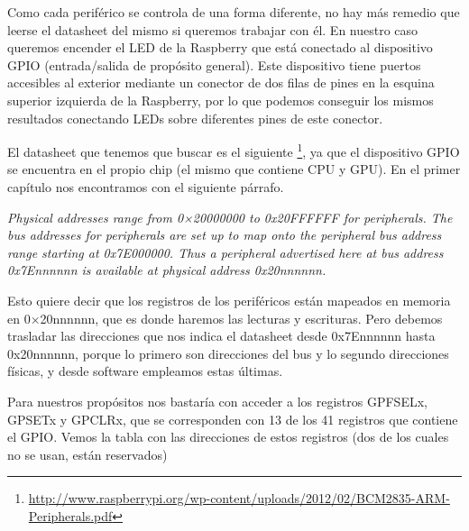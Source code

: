 Como cada periférico se controla de una forma diferente, no hay más remedio que leerse
el datasheet del mismo si queremos trabajar con él. En nuestro caso queremos encender el LED
de la Raspberry que está conectado al dispositivo GPIO (entrada/salida de propósito general).
Este dispositivo tiene puertos accesibles al exterior mediante un conector de dos filas de
pines en la esquina superior izquierda de la Raspberry, por lo que podemos conseguir los
mismos resultados conectando LEDs sobre diferentes pines de este conector.

El datasheet que tenemos que buscar es el siguiente
\footnote{\url{http://www.raspberrypi.org/wp-content/uploads/2012/02/BCM2835-ARM-Peripherals.pdf}},
ya que el dispositivo GPIO se encuentra en el propio chip (el mismo que contiene CPU y GPU).
En el primer capítulo nos encontramos con el siguiente párrafo.

{\it Physical addresses range from 0×20000000 to 0x20FFFFFF for peripherals. The bus addresses
for peripherals are set up to map onto the peripheral bus address range starting at
0x7E000000. Thus a peripheral advertised here at bus address 0x7Ennnnnn is available
at physical address 0x20nnnnnn.}

Esto quiere decir que los registros de los periféricos están mapeados en memoria en
0×20nnnnnn, que es donde haremos las lecturas y escrituras. Pero debemos
trasladar las direcciones que nos indica el datasheet desde 0x7Ennnnnn hasta 0x20nnnnnn,
porque lo primero son direcciones del bus y lo segundo direcciones físicas, y desde
software empleamos estas últimas.

Para nuestros propósitos nos bastaría con acceder a los registros GPFSELx, GPSETx y GPCLRx,
que se corresponden con 13 de los 41 registros que contiene el GPIO. Vemos la tabla con las
direcciones de estos registros (dos de los cuales no se usan, están reservados)


